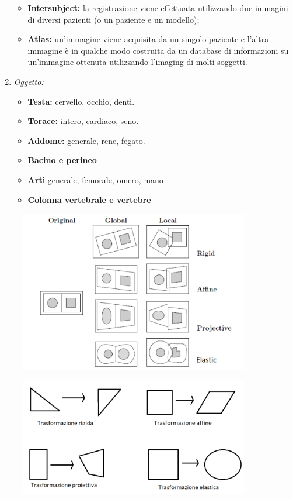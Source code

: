 \begin{enumerate}
\begin{itemize}
              \item \textbf{Intersubject:} la registrazione viene effettuata utilizzando due
                    immagini di diversi pazienti (o un paziente e un modello);
              \item \textbf{Atlas:} un'immagine viene acquisita da un singolo paziente e
                    l'altra immagine è in qualche modo costruita da un database
                    di informazioni su un'immagine ottenuta utilizzando l'imaging
                    di molti soggetti.
          \end{itemize}
    \item \textit{Oggetto:}
          \begin{itemize}
              \item \textbf{Testa:} cervello, occhio, denti.
              \item \textbf{Torace:} intero, cardiaco, seno.
              \item \textbf{Addome:} generale, rene, fegato.
              \item \textbf{Bacino e perineo}
              \item \textbf{Arti} generale, femorale, omero, mano
              \item \textbf{Colonna vertebrale e vertebre}
          \end{itemize}
\end{enumerate}

\begin{figure}[H]
    \centering
    \includegraphics[width=10cm, keepaspectratio]{capitoli/immagini/imgs/dominio.png}
\end{figure}

\begin{figure}[H]
    \centering
    \includegraphics[width=10cm, keepaspectratio]{capitoli/immagini/imgs/tipi-trasformazione.png}
\end{figure}

